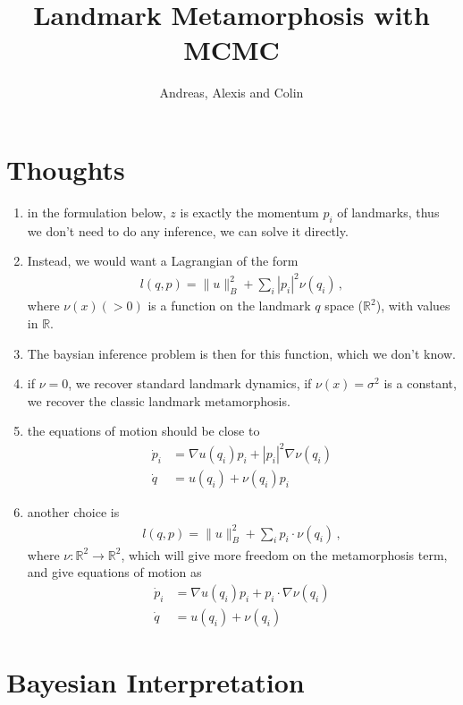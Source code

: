 \documentclass{article}
\begin{document}
\title{Landmark Metamorphosis with MCMC}
\author{Andreas, Alexis and Colin}
\maketitle

\section{Thoughts}

\begin{enumerate}
  \item in the formulation below, $z$ is exactly the momentum $p_i$ of landmarks, thus we don't need to do any inference, we can solve it directly. 
  \item Instead, we would want a Lagrangian of the form
    \begin{align}
      l(q,p) = \|u\|_B^2 + \sum_i |p_i|^2 \nu(q_i) \, , 
    \end{align}
    where $\nu(x)(>0)$ is a function on the landmark $q$ space ($\mathbb R^2$), with values in $\mathbb R$. 
  \item The baysian inference problem is then for this function, which we don't know. 
  \item if $\nu=0$, we recover standard landmark dynamics, if $\nu(x)=\sigma^2$ is a constant, we recover the classic landmark metamorphosis.  
  \item the equations of motion should be close to 
    \begin{align}
      \dot p_i  &= \nabla u(q_i)p_i  + |p_i|^2 \nabla \nu(q_i)\\
      \dot q &= u(q_i) + \nu(q_i) p_i 
    \end{align}
  \item another choice is 
    \begin{align}
      l(q,p) = \|u\|_B^2 + \sum_i p_i\cdot \nu(q_i) \, , 
    \end{align}
    where $\nu:\mathbb R^2 \to \mathbb R^2$, which will give more freedom on the metamorphosis term, and give equations of motion as 
\begin{align}
      \dot p_i  &= \nabla u(q_i)p_i  + p_i \cdot \nabla \nu(q_i)\\
      \dot q &= u(q_i) + \nu(q_i) 
    \end{align}
\end{enumerate}
\section{Bayesian Interpretation}
\end{document}
